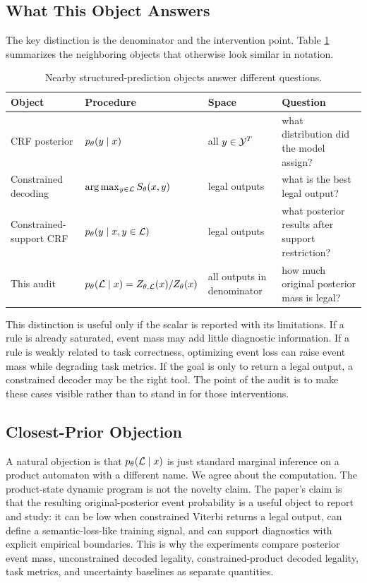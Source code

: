 \subsection{What This Object Answers}

The key distinction is the denominator and the intervention point.  Table
\ref{tab:intro:objects} summarizes the neighboring objects that otherwise look
similar in notation.

\begin{table}[t]
\centering
\small
\caption{Nearby structured-prediction objects answer different questions.}
\label{tab:intro:objects}
\begin{tabular}{llll}
\toprule
Object & Procedure & Space & Question \\
\midrule
CRF posterior &
\(p_{\theta}(y\mid x)\) &
all \(y\in\mathcal{Y}^T\) &
what distribution did the model assign? \\
Constrained decoding &
\(\arg\max_{y\in\mathcal{L}} S_\theta(x,y)\) &
legal outputs &
what is the best legal output? \\
Constrained-support CRF &
\(p_{\theta}(y\mid x,y\in\mathcal{L})\) &
legal outputs &
what posterior results after support restriction? \\
This audit &
\(p_{\theta}(\mathcal{L}\mid x)=Z_{\theta,\mathcal{L}}(x)/Z_\theta(x)\) &
all outputs in denominator &
how much original posterior mass is legal? \\
\bottomrule
\end{tabular}
\end{table}

This distinction is useful only if the scalar is reported with its limitations.
If a rule is already saturated, event mass may add little diagnostic
information.  If a rule is weakly related to task correctness, optimizing event
loss can raise event mass while degrading task metrics.  If the goal is only to
return a legal output, a constrained decoder may be the right tool.  The point
of the audit is to make these cases visible rather than to stand in for those
interventions.

\subsection{Closest-Prior Objection}

A natural objection is that \(p_{\theta}(\mathcal{L}\mid x)\) is just standard marginal
inference on a product automaton with a different name.  We agree about the
computation.  The product-state dynamic program is not the novelty claim.  The
paper's claim is that the resulting original-posterior event probability is a
useful object to report and study: it can be low when constrained Viterbi
returns a legal output, can define a semantic-loss-like training signal, and can
support diagnostics with explicit empirical boundaries.  This is why the
experiments compare posterior event mass, unconstrained decoded legality,
constrained-product decoded legality, task metrics, and uncertainty baselines
as separate quantities.
